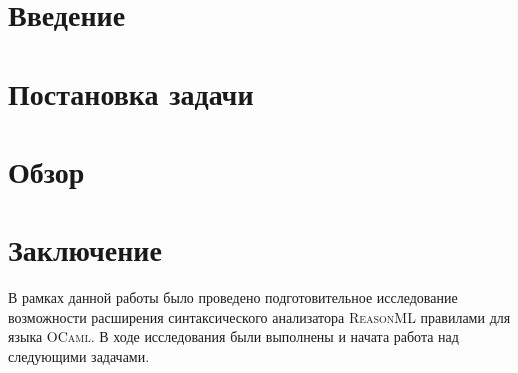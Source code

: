
\usepackage{newfloat,caption,float}
\usepackage{newfloat}
\usepackage{subcaption}

\captionsetup[example]{labelfont=bf}


\captionsetup[subexample]{labelformat=simple}

\newcommand{\ReasonML}{\textsc{ReasonML}}
\newcommand{\OCaml}{\textsc{OCaml}}
\newcommand{\ocamllex}{\textsc{ocamllex}}
\newcommand{\ocamlyacc}{\textsc{ocamlyacc}}
\newcommand{\merlin}{\textsc{merlin}}





\maketitle
\setcounter{tocdepth}{2}
\tableofcontents

\section{Введение}


\section{Постановка задачи}
\label{sec:task}


\section{Обзор}


\section{Заключение}
В рамках данной работы было проведено подготовительное исследование возможности расширения синтаксического анализатора \ReasonML{} правилами для языка \OCaml{}. В ходе исследования были выполнены и начата работа над следующими задачами.



